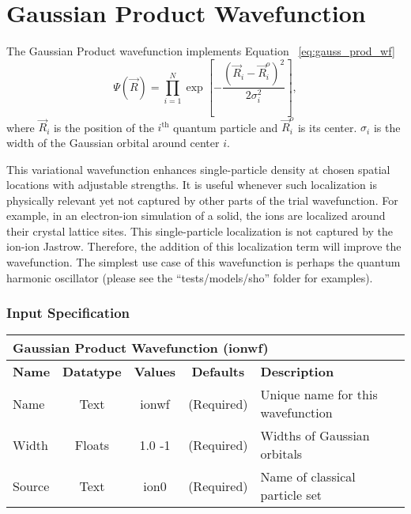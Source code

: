 \section{Gaussian Product Wavefunction}
\label{sec:ionwf}

The Gaussian Product wavefunction implements Equation ~\ref{eq:gauss_prod_wf}
\begin{equation}
\Psi(\vec{R}) = \prod_{i=1}^N \exp\left[ -\frac{(\vec{R}_i-\vec{R}_i^o)^2}{2\sigma_i^2} \right]
\label{eq:gauss_prod_wf},
\end{equation}
where $\vec{R}_i$ is the position of the $i^{\text{th}}$ quantum particle and $\vec{R}_i^o$ is its center. $\sigma_i$ is the width of the Gaussian orbital around center $i$.

This variational wavefunction enhances single-particle density at chosen spatial locations with adjustable strengths. It is useful whenever such localization is physically relevant yet not captured by other parts of the trial wavefunction. For example, in an electron-ion simulation of a solid, the ions are localized around their crystal lattice sites. This single-particle localization is not captured by the ion-ion Jastrow. Therefore, the addition of this localization term will improve the wavefunction. The simplest use case of this wavefunction is perhaps the quantum harmonic oscillator (please see the ``tests/models/sho'' folder for examples).

\subsubsection{Input Specification}

\begin{table}[h]
\begin{center}
\begin{tabular}{l c c c l }
\hline
\multicolumn{5}{l}{Gaussian Product Wavefunction (ionwf)} \\
\hline
\bfseries Name & \bfseries Datatype & \bfseries Values & \bfseries Defaults  & \bfseries Description \\
\hline
Name & Text & ionwf & (Required) & Unique name for this wavefunction \\
Width & Floats & 1.0 -1 & (Required) & Widths of Gaussian orbitals\\ 
Source & Text & ion0 & (Required) & Name of classical particle set\\ 
\hline
\end{tabular}
\end{center}
\end{table}

